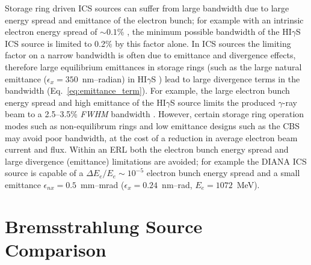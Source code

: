 \documentclass[../main.tex]{subfiles}
\begin{document}
Storage ring driven ICS sources can suffer from large bandwidth due to large energy spread and emittance of the electron bunch; for example with an intrinsic electron energy spread of $\sim0.1$\% \cite{litvinenko1996intense}, the minimum possible bandwidth of the HI$\gamma$S ICS source is limited to 0.2\% by this factor alone. In ICS sources the limiting factor on a narrow bandwidth is often due to emittance and divergence effects, therefore large equilibrium emittances in storage rings (such as the large natural emittance ($\epsilon_{x} = 350$~\si{\nano\meter}--\si{radian}) in HI$\gamma$S \cite{weller2009research}) lead to large divergence terms in the bandwidth (Eq.~\ref{eq:emittance_term}). For example, the large electron bunch energy spread and high emittance of the HI$\gamma$S source limits the produced $\gamma$-ray beam to a 2.5--3.5\% \textit{FWHM} bandwidth \cite{weller2009research}. However, certain storage ring operation modes such as non-equilibrum rings \cite{huang1998laser,owen2013nonequilibrium} and low emittance designs such as the CBS \cite{pan2019design} may avoid poor bandwidth, at the cost of a reduction in average electron beam current and flux. Within an ERL both the electron bunch energy spread and large divergence (emittance) limitations are avoided; for example the DIANA ICS source is capable of a $\Delta E_{e}/E_{e}\sim10^{-5}$ electron bunch energy spread and a small emittance $\epsilon_{nx} = 0.5$~\si{\milli\meter}--\si{\milli\radian} ($\epsilon_{x} = 0.24$~\si{\nano\meter}--\si{\radian}, $E_{e} = 1072$~\si{\mega\electronvolt}).

\section{Bremsstrahlung Source Comparison}
\label{sec:bremsstrahlung_comparison}
\end{document}
